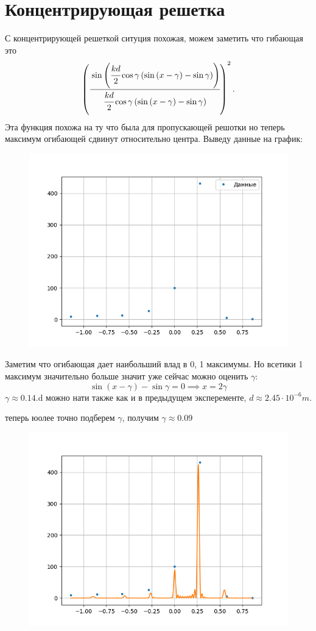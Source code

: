 \section{Концентрирующая решетка}

С концентрирующей решеткой ситуция похожая, можем заметить что гибающая это 
\begin{equation}
    \left( \cfrac{\sin \left( \cfrac{kd}{2}\cos{\gamma} 
    \left( \sin \left( x - \gamma \right) - \sin{\gamma} \right) \right)}
    {\cfrac{kd}{2}\cos{\gamma} 
    \left( \sin \left( x - \gamma \right) - \sin{\gamma} \right)} \right)^2 .
\end{equation}
Эта функция похожа на ту что была для пропускающей решотки но теперь 
максимум огибающей сдвинут относительно центра. Выведу данные на график:
\begin{figure}[h]
    \centering
    \includegraphics[trim={0 0 0 0},clip,width=\textwidth]{Ex_3/ex_2_dat.png}
    \caption{}
    \label{Ex_2_2}
\end{figure}
Заметим что огибающая дает наибольший влад в 0, 1 максимумы. Но всетики 1 максимум 
значительно больше значит уже сейчас можно оценить $\gamma$:
\begin{equation}
    \sin(x - \gamma) - \sin \gamma = 0 \implies x = 2\gamma
\end{equation}
$\gamma \approx 0.14$.d можно нати также как и в предыдущем эксперементе, 
$d \approx 2.45\cdot 10^{-6}m$.

теперь юолее точно подберем $\gamma$, получим $\gamma \approx 0.09$ 
\begin{figure}[h]
    \centering
    \includegraphics[trim={0 0 0 0},clip,width=\textwidth]{Ex_3/ex_2_approx.png}
    \caption{}
    \label{Ex_2_3}
\end{figure}

